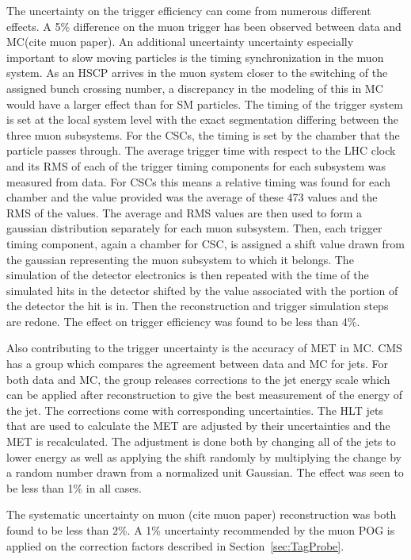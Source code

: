 The uncertainty on the trigger efficiency can come from numerous different effects. A 5\% difference on the muon trigger has been observed between data and MC(cite muon paper).
An additional uncertainty uncertainty especially important to slow moving particles is the timing synchronization in the muon system. As an HSCP arrives in the muon system 
closer to the switching of the assigned bunch crossing number, a discrepancy in the modeling of this in MC would have a larger effect than for SM particles.
The timing of the trigger system is set at the local system level with the
exact segmentation differing between the three muon subsystems. For the CSCs, the timing is set by the chamber that the particle passes through. 
The average trigger time with respect to the LHC clock and its RMS of each of the trigger timing components for each subsystem was measured from data. For CSCs this means
a relative timing was found for each chamber and the value provided was the average of these 473 values and the RMS of the values.
The average and RMS values are then used to form a gaussian distribution separately for each muon subsystem. Then, each trigger timing component, again a chamber for CSC, is
assigned a shift value drawn from the gaussian representing the muon subsystem to which it belongs. The simulation of the detector electronics is then repeated with 
the time of the simulated hits in the detector shifted by the value associated with the portion of the detector the hit is in. Then the reconstruction and trigger
simulation steps are redone. The effect on trigger efficiency was found to be less than 4\%. 

Also contributing to the trigger uncertainty is the accuracy of MET in MC. CMS has a group which compares the agreement between data and MC for jets. For both data and MC,
the group releases corrections to the jet energy scale which can be applied after reconstruction to give the best measurement of the energy of the jet. The corrections
come with corresponding uncertainties. The HLT jets that are used to calculate the MET are adjusted by their uncertainties and the MET is recalculated. The adjustment
is done both by changing all of the jets to lower energy as well as applying the shift randomly by multiplying the change by a random number drawn from a normalized
unit Gaussian. The effect was seen to be less than 1\% in all cases.

The systematic uncertainty on muon (cite muon paper) reconstruction was both found to be less than 2\%.
A 1\% uncertainty recommended by the muon POG is applied on the correction factors described in Section~\ref{sec:TagProbe}.

